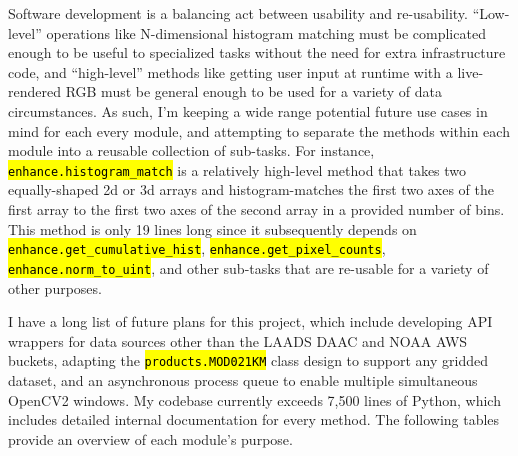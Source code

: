 \documentclass[12pt]{article}
\newcommand{\hltexttt}[1]{\texttt{\hl{#1}}}
\begin{document}
Software development is a balancing act between usability and re-usability. ``Low-level'' operations like N-dimensional histogram matching must be complicated enough to be useful to specialized tasks without the need for extra infrastructure code, and ``high-level'' methods like getting user input at runtime with a live-rendered RGB must be general enough to be used for a variety of data circumstances. As such, I'm keeping a wide range potential future use cases in mind for each every module, and attempting to separate the methods within each module into a reusable collection of sub-tasks. For instance, \hltexttt{enhance.histogram\_match} is a relatively high-level method that takes two equally-shaped 2d or 3d arrays and histogram-matches the first two axes of the first array to the first two axes of the second array in a provided number of bins. This method is only 19 lines long since it subsequently depends on \hltexttt{enhance.get\_cumulative\_hist}, \hltexttt{enhance.get\_pixel\_counts}, \hltexttt{enhance.norm\_to\_uint}, and other sub-tasks that are re-usable for a variety of other purposes.

I have a long list of future plans for this project, which include developing API wrappers for data sources other than the LAADS DAAC and NOAA AWS buckets, adapting the \hltexttt{products.MOD021KM} class design to support any gridded dataset, and an asynchronous process queue to enable multiple simultaneous OpenCV2 windows. My codebase currently exceeds 7,500 lines of Python, which includes detailed internal documentation for every method. The following tables provide an overview of each module's purpose.
\end{document}
